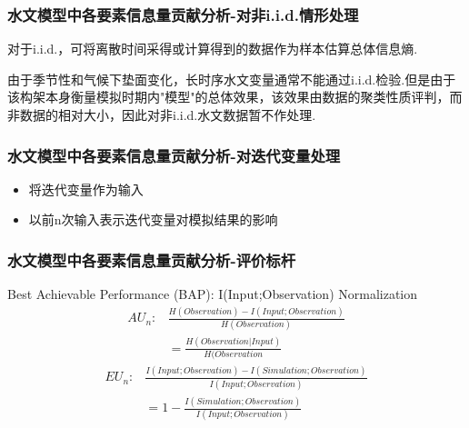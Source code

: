 \documentclass{beamer}
\begin{document}
\begin{CJK}{UTF8}{gkai}
\begin{frame}
\frametitle{水文模型中各要素信息量贡献分析-对非i.i.d.情形处理}
对于i.i.d.，可将离散时间采得或计算得到的数据作为样本估算总体信息熵.

由于季节性和气候下垫面变化，长时序水文变量通常不能通过i.i.d.检验.但是由于该构架本身衡量模拟时期内"模型"的总体效果，该效果由数据的聚类性质评判，而非数据的相对大小，因此对非i.i.d.水文数据暂不作处理.
\end{frame}

\begin{frame}
\frametitle{水文模型中各要素信息量贡献分析-对迭代变量处理}
\begin{itemize}
\item 将迭代变量作为输入
\item 以前n次输入表示迭代变量对模拟结果的影响
\end{itemize}
\end{frame}

\begin{frame}
\frametitle{水文模型中各要素信息量贡献分析-评价标杆}

 Best Achievable Performance  (BAP): I(Input;Observation)
\newline
\centering   Normalization
\begin{equation}
\begin{split}
AU_n: &\frac{H(Observation)-I(Input;Observation)}{H(Observation)}\\&= \frac{H(Observation|Input)}{H(Observation}
\end{split}
\end{equation}
\begin{equation}
\begin{split}
EU_n: &\frac{I(Input;Observation)-I(Simulation;Observation)}{I(Input;Observation)}\\&=1-\frac{I(Simulation;Observation)}{I(Input;Observation)}
\end{split}
\end{equation}
\end{frame}


\end{CJK}
\end{document}
